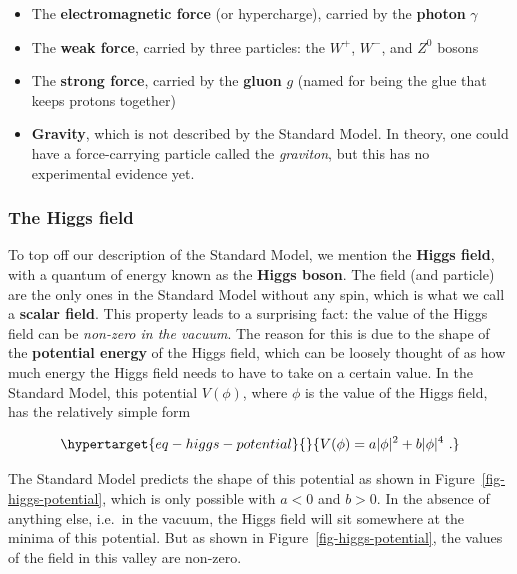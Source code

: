\documentclass[
  11pt,
  numbers=noendperiod]{book}
\providecommand{\tightlist}{%
  \setlength{\itemsep}{0pt}\setlength{\parskip}{0pt}}\usepackage{longtable,booktabs,array}
\begin{document}
\begin{itemize}
\tightlist
\item
  The \textbf{electromagnetic force} (or hypercharge), carried by the
  \textbf{photon} \(\gamma\)
\item
  The \textbf{weak force}, carried by three particles: the \(W^+\),
  \(W^-\), and \(Z^0\) bosons
\item
  The \textbf{strong force}, carried by the \textbf{gluon} \(g\) (named
  for being the glue that keeps protons together)
\item
  \textbf{Gravity}, which is not described by the Standard Model. In
  theory, one could have a force-carrying particle called the
  \emph{graviton}, but this has no experimental evidence yet.
\end{itemize}

\hypertarget{the-higgs-field}{%
\subsubsection*{The Higgs field}\label{the-higgs-field}}

To top off our description of the Standard Model, we mention the
\textbf{Higgs field}, with a quantum of energy known as the
\textbf{Higgs boson}. The field (and particle) are the only ones in the
Standard Model without any spin, which is what we call a \textbf{scalar
field}. This property leads to a surprising fact: the value of the Higgs
field can be \emph{non-zero in the vacuum}. The reason for this is due
to the shape of the \textbf{potential energy} of the Higgs field, which
can be loosely thought of as how much energy the Higgs field needs to
have to take on a certain value. In the Standard Model, this potential
\(V(\phi)\), where \(\phi\) is the value of the Higgs field, has the
relatively simple form

\begin{equation}\protect\hypertarget{eq-higgs-potential}{}{
V(\phi)=a|\phi|^2+b|\phi|^4~.
}\label{eq-higgs-potential}\end{equation}

The Standard Model predicts the shape of this potential as shown in
Figure~\ref{fig-higgs-potential}, which is only possible with \(a < 0\)
and \(b > 0\). In the absence of anything else, i.e.~in the vacuum, the
Higgs field will sit somewhere at the minima of this potential. But as
shown in Figure~\ref{fig-higgs-potential}, the values of the field in
this valley are non-zero.
\end{document}
